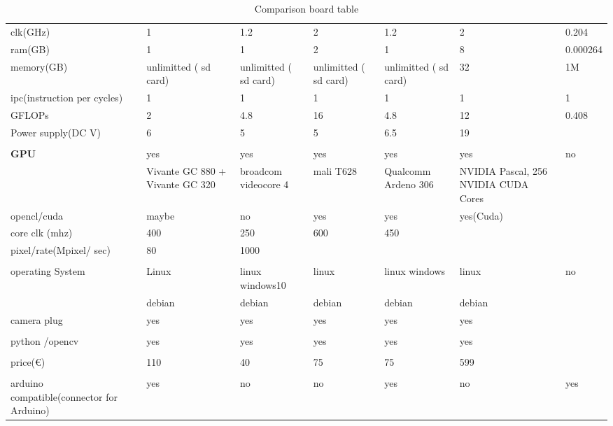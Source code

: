 \documentclass[english]{book_template} %
\begin{document}
\begin{table}[]
{\begin{tabular}{p{3.5cm}|p{3cm}p{3cm}p{3cm}p{3cm}p{3cm}p{3cm}}
clk(GHz) & 1 & 1.2 & 2 & 1.2 & 2 & 0.204 \\
ram(GB) & 1 & 1 & 2 & 1 & 8 & 0.000264 \\
memory(GB) & unlimitted ( sd card) & unlimitted ( sd card) & unlimitted ( sd card) & unlimitted ( sd card) & 32 & 1M \\
ipc(instruction per cycles) & 1 & 1 & 1 & 1 & 1 & 1 \\
GFLOPs & 2 & 4.8 & 16 & 4.8 & 12 & 0.408 \\
Power supply\newline(DC V) & 6 & 5 & 5 & 6.5 & 19 &  \\
 &  &  &  &  &  &  \\
\textbf{GPU} & yes & yes & yes & yes & yes & no \\
 & Vivante GC 880 + Vivante GC 320 & broadcom videocore 4 & mali T628 & Qualcomm Ardeno 306 & NVIDIA Pascal, 256 NVIDIA CUDA Cores &  \\
opencl/cuda & maybe & no & yes & yes & yes(Cuda) &  \\
core clk (mhz) & 400 & 250 & 600 & 450 &  &  \\
pixel/rate(Mpixel/ sec) & 80 & 1000 &  &  &  &  \\
 &  &  &  &  &  &  \\
operating System & Linux & linux \newline windows10 & linux & linux \newline windows & linux & no \\
 & debian & debian & debian & debian & debian &  \\
camera plug & yes & yes & yes & yes & yes &  \\
 &  &  &  &  &  &  \\
python /opencv & yes & yes & yes & yes & yes &  \\
 &  &  &  &  &  &  \\
price(€) & 110 & 40 & 75 & 75 & 599 &  \\
 &  &  &  &  &  &  \\
arduino compatible\newline(connector for Arduino) & yes & no & no & yes & no & yes
\end{tabular}%
}
\caption{Comparison board table \cite{SamsungE46:online} \cite{VideoCor59:online} \cite{iMX6Solo72:online} \cite{JetsonFA42:online} } 
\label{comparaison board table}
\end{table}
\end{document}
